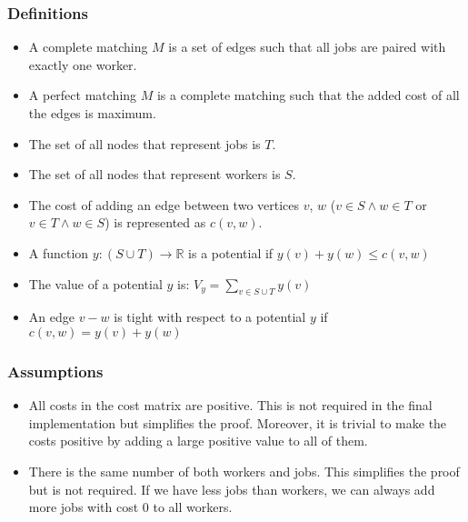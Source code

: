 \subsubsection*{Definitions}
\begin{itemize}
		\setlength{\itemsep}{0pt}
		\item A complete matching $M$ is a set of edges such that all 
				jobs are paired with exactly one worker.
		\item A perfect matching $M$  is a complete matching such that 
				the added cost of all the edges is maximum.
		\item The set of all nodes that represent jobs is $T$.
		\item The set of all nodes that represent workers is $S$.
		\item The cost of adding an edge between two vertices $v$, $w$
				($v\in S \wedge w\in T$ or $v\in T \wedge w \in S$)
				is represented as $c(v,w)$.  
		\item A function $y:(S\cup T)\rightarrow \mathbb{R}$ is a
				potential if $y(v)+y(w)\le c(v,w)$
		\item The value of a potential $y$ is: $V_y= \sum_{v\in S \cup T}y(v)$
		\item An edge $v-w$ is tight with respect to a potential $y$
				if $c(v,w)=y(v)+y(w)$
\end{itemize}
\subsubsection*{Assumptions}
\begin{itemize}
		\item All costs in the cost matrix are positive. This is not required in
				the final implementation but simplifies the proof. Moreover,
				it is trivial to make the costs positive by adding a large
				positive value to all of them.
		\item There is the same number of both workers and jobs. This 
				simplifies the proof but is not required. If we have less 
				jobs than workers, we can always add more jobs with cost 0
				to all workers.
\end{itemize}

